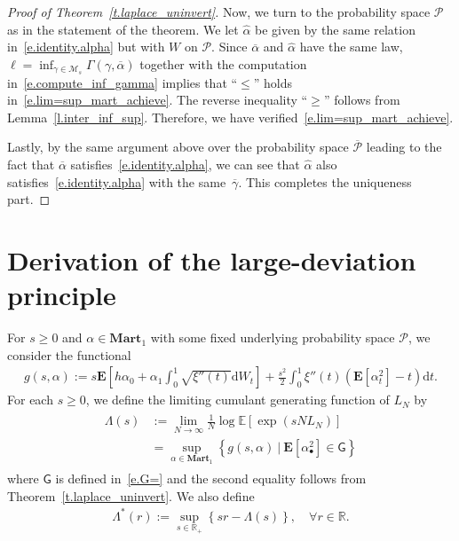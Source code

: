 \documentclass[11pt]{amsart}
\theoremstyle{remark}
\theoremstyle{definition}
\numberwithin{equation}{section}
\numberwithin{proposition}{section}
\numberwithin{figure}{section}
\numberwithin{table}{section}
\newcommand{\R}{\mathbb{R}}
\newcommand{\E}{\mathbb{E}}
\newcommand{\EE}{\mathbf{E}}
\renewcommand{\leq}{\leqslant}
\renewcommand{\geq}{\geqslant}
\renewcommand{\bar}{\overline}
\renewcommand{\hat}{\widehat}
\newcommand{\Ll}{\left}
\newcommand{\Rr}{\right}
\renewcommand{\d}{\mathrm{d}}
\newcommand{\1}{\mathbf{1}}
\newcommand{\msf}{\mathsf}
\newcommand{\msc}{\mathscr}
\newcommand{\bmart}{\mathbf{Mart}}
\newcommand{\cM}{\mathcal{M}}
\begin{document}
\begin{proof}[Proof of Theorem~\ref{t.laplace_uninvert}]
Now, we turn to the probability space $\msc P$ as in the statement of the theorem. We let $\hat \alpha$ be given by the same relation in~\eqref{e.identity.alpha} but with $W$ on $\msc P$. Since $\bar \alpha$ and $\hat \alpha$ have the same law, $\ell =\inf_{\gamma\in\cM_s}\Gamma(\gamma,\bar\alpha)$ together with the computation in~\eqref{e.compute_inf_gamma} implies that ``$\leq $'' holds in~\eqref{e.lim=sup_mart_achieve}. The reverse inequality ``$\geq $'' follows from Lemma~\ref{l.inter_inf_sup}. Therefore, we have verified~\eqref{e.lim=sup_mart_achieve}.

Lastly, by the same argument above over the probability space $\bar{\msc P}$ leading to the fact that $\bar\alpha$ satisfies~\eqref{e.identity.alpha}, we can see that $\hat\alpha$ also satisfies~\eqref{e.identity.alpha} with the same~$\bar\gamma$. This completes the uniqueness part.
\end{proof}







\section{Derivation of the large-deviation principle}
\label{s.derivation}

For $s\geq0$ and $\alpha\in\bmart_1$ with some fixed underlying probability space $\msc P$, we consider the functional
\begin{align}\label{e.g(s,alpha)=}
    g(s,\alpha):=s\EE\Ll[h\alpha_0 + \alpha_1\int_0^1\sqrt{\xi''(t)}\d W_t\Rr]+\frac{s^2}{2}\int_0^1 \xi''(t)\Ll(\EE\Ll[\alpha_t^2\Rr] -t \Rr)\d t.
\end{align}
For each $s\geq0$, we define the limiting cumulant generating function of $L_N$ by
\begin{align}\label{e.Lambda(s)=}
\begin{split}
    \Lambda(s)&:=\lim_{N\to\infty} \frac{1}{N}\log \E \Ll[\exp\Ll(sNL_N\Rr)\Rr] \\
&=\sup_{\alpha\in\bmart_1}\Ll\{g(s,\alpha) \ \big|\ \EE\Ll[\alpha^2_\bullet\Rr]\in \msf G\Rr\}
\end{split}
\end{align}
where $\msf G$ is defined in~\eqref{e.G=} and the second equality follows from Theorem~\ref{t.laplace_uninvert}. We also define
\begin{align}\label{e.Lambda^*=}
    \Lambda^*(r) := \sup_{s\in\R_+}\Ll\{sr- \Lambda(s)\Rr\},\quad\forall r\in\R.
\end{align}
\end{document}
